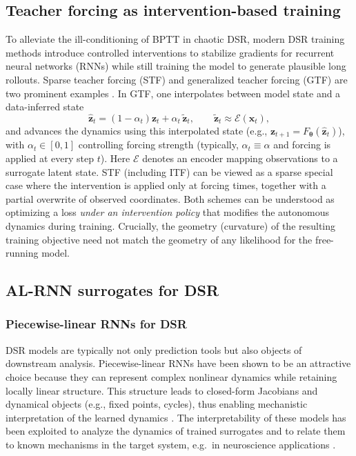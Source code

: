 \documentclass[twoside]{article}
\theoremstyle{plain}
\theoremstyle{definition}
\theoremstyle{remark}
\begin{document}
\subsection{Teacher forcing as intervention-based training}
To alleviate the ill-conditioning of BPTT in chaotic DSR, modern DSR training methods introduce controlled interventions to stabilize gradients for recurrent neural networks (RNNs) while still training the model to generate plausible long rollouts. Sparse teacher forcing (STF) and generalized teacher forcing (GTF) are two prominent examples \citep{mikhaeil2022chaosrnn,hess2023gtf}.
In GTF, one interpolates between model state and a data-inferred state
\begin{equation}
\label{eq:a0:gtf_mix}
\hat{\bm{z}}_t = (1-\alpha_t)\bm{z}_t + \alpha_t\,\tilde{\bm{z}}_t,\qquad \tilde{\bm{z}}_t\approx \mathcal{E}(\bm{x}_t),
\end{equation}
and advances the dynamics using this interpolated state (e.g., $\bm z_{t+1}=F_{\bm\theta}(\hat{\bm z}_t)$), with $\alpha_t\in[0,1]$ controlling forcing strength (typically, $\alpha_t\equiv\alpha$ and forcing is applied at every step $t$). Here $\mathcal{E}$ denotes an encoder mapping observations to a surrogate latent state.
STF (including ITF) can be viewed as a sparse special case where the intervention is applied only at forcing times, together with a partial overwrite of observed coordinates.
Both schemes can be understood as optimizing a loss \emph{under an intervention policy} that modifies the autonomous dynamics during training. Crucially, the geometry (curvature) of the resulting training objective need not match the geometry of any likelihood for the free-running model.

\subsection{AL-RNN surrogates for DSR}
\subsubsection{Piecewise-linear RNNs for DSR}
DSR models are typically not only prediction tools but also objects of downstream analysis. Piecewise-linear RNNs have been shown to be an attractive choice because they can represent complex nonlinear dynamics while retaining locally linear structure. This structure leads to closed-form Jacobians and dynamical objects (e.g., fixed points, cycles), thus enabling mechanistic interpretation of the learned dynamics \citep{eisenmann2023bifurcationsrnn,eisenmann2026invariantmanifolds}. The interpretability of these models has been exploited to analyze the dynamics of trained surrogates and to relate them to known mechanisms in the target system, e.g.\ in neuroscience applications
\citep{durstewitz2023reconstructing,emonds2025control}.
\end{document}
